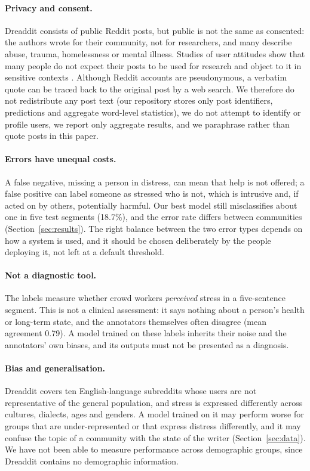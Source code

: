 \paragraph{Privacy and consent.} Dreaddit consists of public Reddit posts, but public is not the same
as consented: the authors wrote for their community, not for researchers, and many describe abuse,
trauma, homelessness or mental illness. Studies of user attitudes show that many people do not expect
their posts to be used for research and object to it in sensitive contexts \cite{fiesler2018participant}.
Although Reddit accounts are pseudonymous, a verbatim quote can be traced back to the original post
by a web search. We therefore do not redistribute any post text (our repository stores only post
identifiers, predictions and aggregate word-level statistics), we do not attempt to identify or profile users, we report only
aggregate results, and we paraphrase rather than quote posts in this paper.

\paragraph{Errors have unequal costs.} A false negative, missing a person in distress, can mean that
help is not offered; a false positive can label someone as stressed who is not, which is intrusive
and, if acted on by others, potentially harmful. Our best model still misclassifies
about one in five test segments (18.7\%), and the error rate differs between communities
(Section~\ref{sec:results}). The right balance between the two error types depends on how a system is
used, and it should be chosen deliberately by the people deploying it, not left at a default
threshold.

\paragraph{Not a diagnostic tool.} The labels measure whether crowd workers \emph{perceived} stress in
a five-sentence segment. This is not a clinical assessment: it says nothing about a person's health
or long-term state, and the annotators themselves often disagree (mean agreement 0.79). A model
trained on these labels inherits their noise and the annotators' own biases, and its outputs must
not be presented as a diagnosis.

\paragraph{Bias and generalisation.} Dreaddit covers ten English-language subreddits whose users are
not representative of the general population, and stress is expressed differently across cultures,
dialects, ages and genders. A model trained on it may perform worse for groups that are
under-represented or that express distress differently, and it may confuse the topic of a community
with the state of the writer (Section~\ref{sec:data}). We have not been able to measure performance
across demographic groups, since Dreaddit contains no demographic information.

